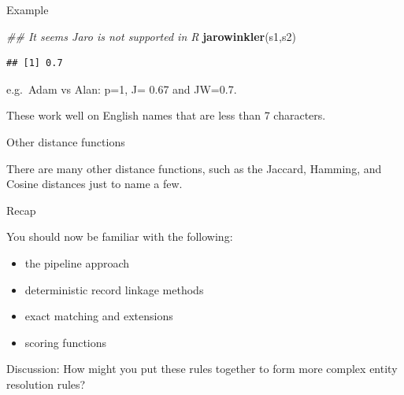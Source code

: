 \documentclass[
  ignorenonframetext,
]{beamer}
\newenvironment{Shaded}{\begin{snugshade}}{\end{snugshade}}
\newcommand{\CommentTok}[1]{\textcolor[rgb]{0.56,0.35,0.01}{\textit{#1}}}
\newcommand{\KeywordTok}[1]{\textcolor[rgb]{0.13,0.29,0.53}{\textbf{#1}}}
\newcommand{\NormalTok}[1]{#1}
\providecommand{\tightlist}{%
  \setlength{\itemsep}{0pt}\setlength{\parskip}{0pt}}
\begin{document}
\begin{frame}[fragile]{Example}
\protect\hypertarget{example-2}{}

\begin{Shaded}
\begin{Highlighting}[]
\CommentTok{## It seems Jaro is not supported in R}
\KeywordTok{jarowinkler}\NormalTok{(s1,s2)}
\end{Highlighting}
\end{Shaded}

\begin{verbatim}
## [1] 0.7
\end{verbatim}

e.g.~Adam vs Alan: p=1, J= 0.67 and JW=0.7.

These work well on English names that are less than 7 characters.

\end{frame}

\begin{frame}{Other distance functions}
\protect\hypertarget{other-distance-functions}{}

There are many other distance functions, such as the Jaccard, Hamming,
and Cosine distances just to name a few.

\end{frame}

\begin{frame}{Recap}
\protect\hypertarget{recap}{}

You should now be familiar with the following:

\begin{itemize}
\tightlist
\item
  the pipeline approach
\item
  deterministic record linkage methods
\item
  exact matching and extensions
\item
  scoring functions
\end{itemize}

Discussion: How might you put these rules together to form more complex
entity resolution rules?

\end{frame}
\end{document}
